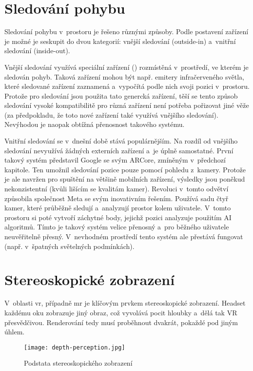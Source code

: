 \section{Sledování pohybu}

Sledování pohybu v~prostoru je řešeno různými způsoby. Podle postavení zařízení je možné je seskupit do dvou kategorií: vnější sledování (outside-in) a~vnitřní sledování (inside-out).

Vnější sledování využívá speciální zařízení () rozmístěná v~prostředí, ve kterém je sledován pohyb. Taková zařízení mohou být např. emitery infračerveného světla, které sledované zařízení zaznamená a~vypočítá podle nich svoji pozici v~prostoru. Protože pro sledování jsou použita tato genercká zařízení, těší se tento způsob sledování vysoké kompatibilitě \poml pro různá zařízení není potřeba pořizovat jiné věže (za předpokladu, že toto nové zařízení také využívá vnějšího sledování). Nevýhodou je naopak obtížná přenosnost takového systému. \cite{vr_tracking_suvi}

Vnitřní sledování se v~dnešní době stává populárnějším. Na rozdíl od vnějšího sledování nevyužívá žádných externích zařízení a~je úplně samostatné. První takový systém představil Google se svým ARCore, zmíněným v~předchozí kapitole. Ten umožnil sledování pozice pouze pomocí pohledu z~kamery. Protože je ale navržen pro spuštění na většině mobilních zařízení, výsledky jsou poněkud nekonzistentní (kvůli lišícím se kvalitám kamer).
Revoluci v~tom\-to odvětví způsobila společnost Meta se svým inovativním řešením. Používá sadu čtyř kamer, které průběžně sledují a~analyzují prostor kolem uživatele. V~tomto prostoru si poté vytvoří záchytné body, jejichž pozici analyzuje použitím AI algoritmů. Tímto je takový systém velice přenosný a~pro běžného uživatele neuvěřitelně přesný. V~nevhodném prostředí tento systém ale přestává fungovat (např. v~špatných světelných podmínkách). \cite{vr_tracking_suvi} \cite{enwiki:1182789097}

\section{Stereoskopické zobrazení}

V~oblasti \gls{vr}, případně \gls{mr} je klíčovým prvkem stereoskopické zobrazení. Headset každému oku zobrazuje jiný obraz, což vyvolává pocit hloubky a~dělá tak VR přesvědčivou. Renderování tedy musí proběhnout dvakrát, pokaždé pod jiným úhlem. \cite{stereoskopie_diagram}

\begin{figure}[H]
    \centering
    \texttt{[image: depth-perception.jpg]}
    \caption{Podstata stereoskopického zobrazení \cite{stereoskopie_diagram}}
    \label{depth_perception}
\end{figure}

